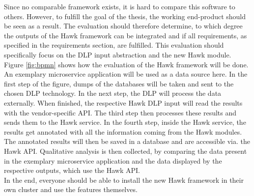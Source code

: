 


\graphicspath{{8/figures/}}

Since no comparable framework exists, it is hard to compare this software to others.
However, to fulfill the goal of the thesis, the working end-product should be seen as a result. 
The evaluation should therefore determine, to which degree the outputs of the Hawk framework can be integrated and if all requirements, as specified in the requirements section, are fulfilled. This evaluation should specifically focus on the DLP input abstraction and the new Hawk module. \\

Figure \ref{fig:bpmn} shows how the evaluation of the Hawk framework will be done. An exemplary microservice application will be used as a data source here. In the first step of the figure, dumps of the databases will be taken and sent to the chosen DLP technology. In the next step, the DLP will process the data externally. When finished, the respective Hawk DLP input will read the results with the vendor-specific API. The third step then processes these results and sends them to the Hawk service. In the fourth step, inside the Hawk service, the results get annotated with all the information coming from the Hawk modules. The annotated results will then be saved in a database and are accessible via. the Hawk API. Qualitative analysis is then collected, by comparing the data present in the exemplary microservice application and the data displayed by the respective outputs, which use the Hawk API.\\

In the end, everyone should be able to install the new Hawk framework in their own cluster and use the features themselves.

